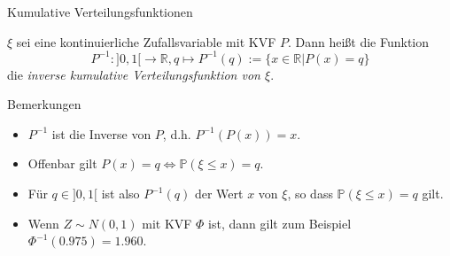 \documentclass[
  8pt,
  ignorenonframetext,
]{beamer}
\begin{document}
\begin{frame}{Kumulative Verteilungsfunktionen}
\protect\hypertarget{kumulative-verteilungsfunktionen-11}{}
\small
\begin{definition}
$\xi$ sei eine kontinuierliche Zufallsvariable mit KVF $P$. Dann heißt die Funktion
\begin{equation}
P^{-1} : ]0,1[ \to \mathbb{R}, q \mapsto P^{-1}(q) := \{x \in \mathbb{R}|P(x) = q\}
\end{equation}
die \textit{inverse kumulative Verteilungsfunktion von $\xi$}.
\end{definition}
\vspace{.1cm}

Bemerkungen

\begin{itemize}
\item $P^{-1}$ ist die Inverse von $P$, d.h. $P^{-1}(P(x)) = x$.
\item Offenbar gilt $P(x) = q \Leftrightarrow \mathbb{P}(\xi \le x) = q$.
\item Für $q \in ]0,1[$ ist also $P^{-1}(q)$ der Wert $x$ von $\xi$, so dass $\mathbb{P}(\xi \le x) = q$ gilt.
\item Wenn $Z \sim N(0,1)$ mit KVF $\Phi$ ist, dann gilt zum Beispiel $\Phi^{-1}(0.975) = 1.960$.
\end{itemize}
\end{frame}
\end{document}
